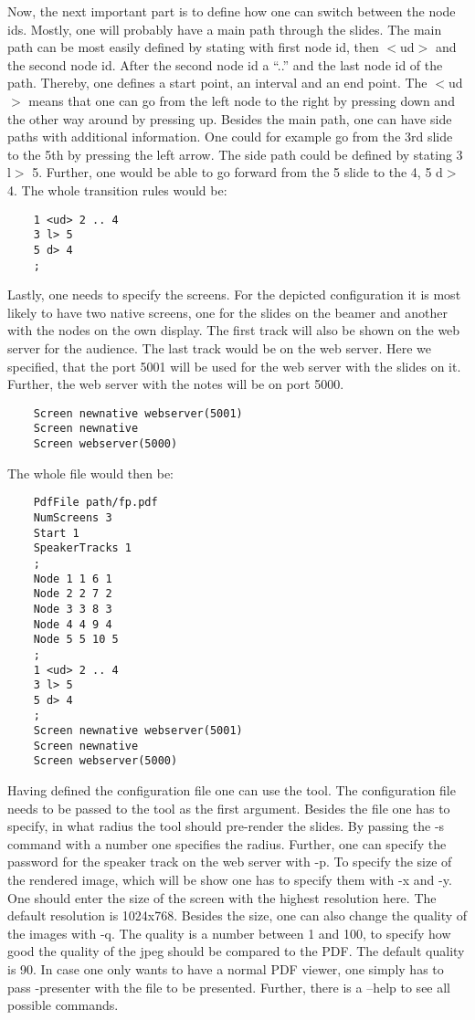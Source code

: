     Now, the next important part is to define how one can switch between the node ids.
    Mostly, one will probably have a main path through the slides.
    The main path can be most easily defined by stating with first node id, then $<$ud$>$ and the second node id.
    After the second node id a ``..'' and the last node id of the path.
    Thereby, one defines a start point, an interval and an end point.
    The $<$ud$>$ means that one can go from the left node to the right by pressing down and the other way around by pressing up.
    Besides the main path, one can have side paths with additional information.
    One could for example go from the 3rd slide to the 5th by pressing the left arrow.
    The side path could be defined by stating 3 l$>$ 5.
    Further, one would be able to go forward from the 5 slide to the 4, 5 d$>$4.
    The whole transition rules would be:
    \begin{verbatim}
    1 <ud> 2 .. 4
    3 l> 5
    5 d> 4
    ;
    \end{verbatim}
    
    Lastly, one needs to specify the screens.
    For the depicted configuration it is most likely to have two native screens, one for the slides on the beamer and another with the nodes on the own display.
    The first track will also be shown on the web server for the audience.
    The last track would be on the web server.
    Here we specified, that the port 5001 will be used for the web server with the slides on it.
    Further, the web server with the notes will be on port 5000.
    \begin{verbatim}
    Screen newnative webserver(5001)
    Screen newnative
    Screen webserver(5000)
    \end{verbatim}
    
    The whole file would then be:
    \begin{verbatim}
    PdfFile path/fp.pdf
    NumScreens 3
    Start 1
    SpeakerTracks 1
    ;
    Node 1 1 6 1
    Node 2 2 7 2
    Node 3 3 8 3
    Node 4 4 9 4
    Node 5 5 10 5
    ;
    1 <ud> 2 .. 4
    3 l> 5
    5 d> 4
    ;
    Screen newnative webserver(5001)
    Screen newnative
    Screen webserver(5000)
    \end{verbatim}
    
    Having defined the configuration file one can use the tool.
    The configuration file needs to be passed to the tool as the first argument.
    Besides the file one has to specify, in what radius the tool should pre-render the slides.
    By passing the -s command with a number one specifies the radius.
    Further, one can specify the password for the speaker track on the web server with -p.
    To specify the size of the rendered image, which will be show one has to specify them with -x and -y.
    One should enter the size of the screen with the highest resolution here.
    The default resolution is 1024x768.
    Besides the size, one can also change the quality of the images with -q.
    The quality is a number between 1 and 100, to specify how good the quality of the jpeg should be compared to the PDF.
    The default quality is 90.
    In case one only wants to have a normal PDF viewer, one simply has to pass -presenter with the file to be presented.
    Further, there is a --help to see all possible commands.
